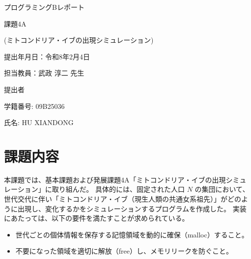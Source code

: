 \documentclass[a4paper,11pt]{jsarticle}
\begin{document}
\begin{titlepage}
    \centering

    \vspace*{3cm}
    
    {\LARGE プログラミングBレポート \par}
    
    \vspace{2cm}
    
    {\LARGE 課題4A \par}
    {\LARGE (ミトコンドリア・イブの出現シミュレーション)\par}
    
    \vspace{4cm}
    
    {\large 提出年月日：令和8年2月4日 \par} 

    \vspace{1cm}
    
    {\large 担当教員：武政 淳二 先生 \par}

    \vspace{4cm}
    
    {\large 提出者 \par}
    
    \vspace{1cm}
    
    {\Large 学籍番号: 09B25036}
    
    \vspace{0.5cm}
    
    {\Large 氏名: HU XIANDONG}
    
    \vfill
\end{titlepage}

\section{課題内容}
本課題では、基本課題および発展課題4A「ミトコンドリア・イブの出現シミュレーション」に取り組んだ。
具体的には、固定された人口 $N$ の集団において、世代交代に伴い「ミトコンドリア・イブ（現生人類の共通女系祖先）」がどのように出現し、変化するかをシミュレーションするプログラムを作成した。
実装にあたっては、以下の要件を満たすことが求められている。
\begin{itemize}
    \item 世代ごとの個体情報を保存する記憶領域を動的に確保（malloc）すること。
    \item 不要になった領域を適切に解放（free）し、メモリリークを防ぐこと。
\end{itemize}
\end{document}
